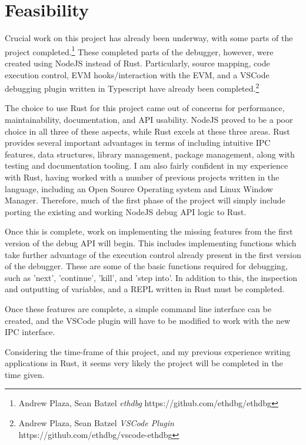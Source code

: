 \documentclass[]{article}
\begin{document}
\section{Feasibility}
Crucial work on this project has already been underway, with some parts of the project completed.\footnote{Andrew Plaza, Sean Batzel \textit{ethdbg} https://github.com/ethdbg/ethdbg} These completed parts of the debugger, however, were created using NodeJS instead of Rust. Particularly, source mapping, code execution control, EVM hooks/interaction with the EVM, and a VSCode debugging plugin written in Typescript have already been completed.\footnote{Andrew Plaza, Sean Batzel \textit{VSCode Plugin} https://github.com/ethdbg/vscode-ethdbg}

The choice to use Rust for this project came out of concerns for performance, maintainability, documentation, and API usability. NodeJS proved to be a poor choice in all three of these aspects, while Rust excels at these three areas. Rust provides several important advantages in terms of including intuitive IPC features, data structures, library management, package management, along with testing and documentation tooling. I am also fairly confident in my experience with Rust, having worked with a number of previous projects written in the language, including an Open Source Operating system and Linux Window Manager. Therefore, much of the first phase of the project will simply include porting the existing and working NodeJS debug API logic to Rust.

Once this is complete, work on implementing the missing features from the first version of the debug API will begin. This includes implementing functions which take further advantage of the execution control already present in the first version of the debugger. These are some of the basic functions required for debugging, such as 'next', 'continue', 'kill', and 'step into'. In addition to this, the inspection and outputting of variables, and a REPL written in Rust must be completed.

Once these features are complete, a simple command line interface can be created, and the VSCode plugin will have to be modified to work with the new IPC interface.

Considering the time-frame of this project, and my previous experience writing applications in Rust, it seems very likely the project will be completed in the time given.
 
\end{document}
